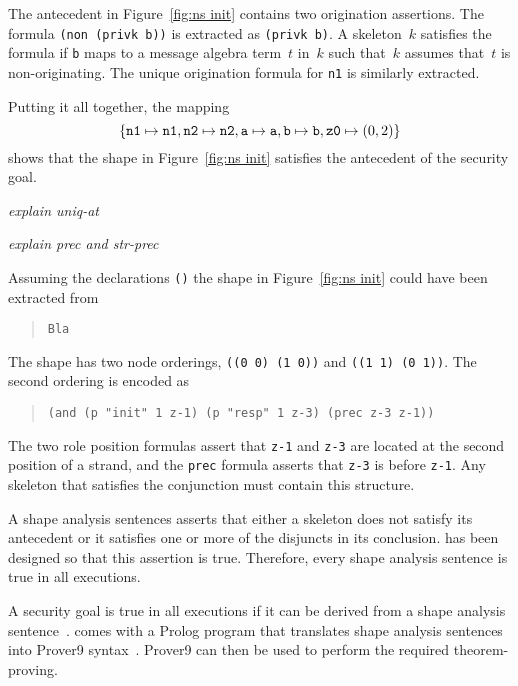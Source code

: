 \documentclass[12pt]{article}
\begin{document}
The antecedent in Figure~\ref{fig:ns init} contains two origination
assertions.  The formula \texttt{(non (privk b))} is extracted as
\texttt{(privk b)}.  A skeleton~$k$ satisfies the formula if
\texttt{b} maps to a message algebra term~$t$ in~$k$ such that~$k$
assumes that~$t$ is non-originating.  The unique origination formula for
\texttt{n1} is similarly extracted.

Putting it all together, the mapping
\[\{\mathtt{n1}\mapsto\mathtt{n1},
\mathtt{n2}\mapsto\mathtt{n2}, \mathtt{a}\mapsto\mathtt{a},
\mathtt{b}\mapsto\mathtt{b},\mbox{\tt z0}\mapsto(0,2)\}\] shows that
the shape in Figure~\ref{fig:ns init} satisfies the antecedent of the
security goal.

\emph{explain uniq-at}

\emph{explain prec and str-prec}

Assuming the declarations \texttt{()} the shape in Figure~\ref{fig:ns
  init} could have been extracted from
\begin{quote}
\begin{verbatim}
Bla
\end{verbatim}
\end{quote}

The shape has two node orderings, \texttt{((0 0) (1 0))} and
\texttt{((1 1) (0 1))}.  The second ordering is encoded as
\begin{quote}
\begin{verbatim}
(and (p "init" 1 z-1) (p "resp" 1 z-3) (prec z-3 z-1))
\end{verbatim}
\end{quote}
The two role position formulas assert that \texttt{z-1} and
\texttt{z-3} are located at the second position of a strand, and the
\texttt{prec} formula asserts that \texttt{z-3} is before
\texttt{z-1}.  Any skeleton that satisfies the conjunction must
contain this structure.

A shape analysis sentences asserts that either a skeleton does not
satisfy its antecedent or it satisfies one or more of the disjuncts in
its conclusion.  {\cpsa} has been designed so that this assertion is
true.  Therefore, every shape analysis sentence is true in all
executions.

A security goal is true in all executions if it can be derived from a
shape analysis sentence~\cite{Ramsdell12}.  {\cpsa} comes with a
Prolog program that translates shape analysis sentences into Prover9
syntax~\cite{prover9}.  Prover9 can then be used to perform the
required theorem-proving.
\end{document}
